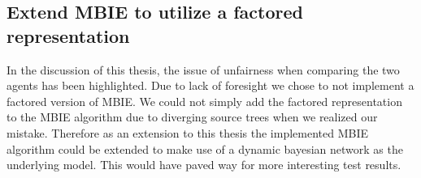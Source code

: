 \subsection{Extend MBIE to utilize a factored representation}
\label{sec:factored_mbie}

In the discussion of this thesis, the issue of unfairness when
comparing the two agents has been highlighted. Due to lack of
foresight we chose to not implement a factored version of MBIE. We could not simply
add the factored representation to the MBIE algorithm due to diverging source
trees when we realized our mistake. Therefore as an extension to this thesis
the implemented MBIE algorithm could be extended to make use of a dynamic
bayesian network as the underlying model. This would have paved way for more
interesting test results.
